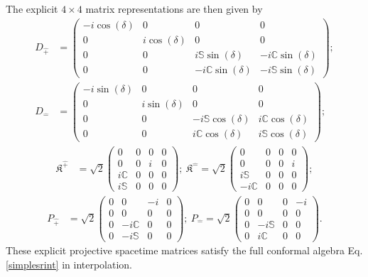 \documentclass[%
 reprint,
superscriptaddress,
 amsmath,amssymb,
 aps,
]{revtex4-2}
\begin{document}
The explicit $4\times4$ matrix representations are then given by %
\begin{align}
    D_{\hat{+}}&=\begin{pmatrix}
        -i\cos{(\delta)}&0&0&0\\
        0&i\cos{(\delta)}&0&0\\
        0&0&i\mathbb{S}\sin{(\delta)}&-i\mathbb{C}\sin{(\delta)}\\
        0&0&-i\mathbb{C}\sin{(\delta)}&-i\mathbb{S}\sin{(\delta)}
    \end{pmatrix};\nonumber\\
    D_{\hat{-}}&=\begin{pmatrix}
        -i\sin{(\delta)}&0&0&0\\
        0&i\sin{(\delta)}&0&0\\
        0&0&-i\mathbb{S}\cos{(\delta)}&i\mathbb{C}\cos{(\delta)}\\
        0&0&i\mathbb{C}\cos{(\delta)}&i\mathbb{S}\cos{(\delta)}
    \end{pmatrix};\nonumber
\end{align}
\begin{align}
    \mathfrak{K}^{\hat{+}}&=\sqrt{2}\begin{pmatrix}
        0&0&0&0\\
        0&0&i&0\\
        i\mathbb{C}&0&0&0\\
        i\mathbb{S}&0&0&0
    \end{pmatrix};~\mathfrak{K}^{\hat{-}}=\sqrt{2}\begin{pmatrix}
        0&0&0&0\\
        0&0&0&i\\
        i\mathbb{S}&0&0&0\\
        -i\mathbb{C}&0&0&0
    \end{pmatrix};\nonumber
    \end{align}
    \begin{align}
     P_{\hat{+}}&=\sqrt{2}\begin{pmatrix}
        0&0&-i&0\\
        0&0&0&0\\
        0&-i\mathbb{C}&0&0\\
        0&-i\mathbb{S}&0&0
    \end{pmatrix};~P_{\hat{-}}=\sqrt{2}\begin{pmatrix}
        0&0&0&-i\\
        0&0&0&0\\
        0&-i\mathbb{S}&0&0\\
        0&i\mathbb{C}&0&0
    \end{pmatrix}.
    \label{matrix-rep-conformal-generators}
    \end{align}
%
These explicit projective spacetime matrices satisfy the full conformal algebra Eq.\eqref{simplesrint} in interpolation. 
\end{document}
